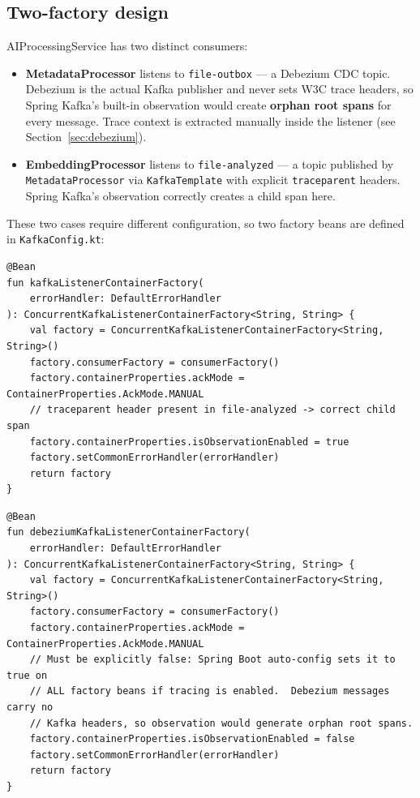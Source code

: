 \documentclass[11pt,a4paper]{article}
\begin{document}
\subsection{Two-factory design}

AIProcessingService has two distinct consumers:

\begin{itemize}
  \item \textbf{MetadataProcessor} listens to \texttt{file-outbox} --- a
        Debezium CDC topic.  Debezium is the actual Kafka publisher and never
        sets W3C trace headers, so Spring Kafka's built-in observation would
        create \textbf{orphan root spans} for every message.  Trace context is
        extracted manually inside the listener (see Section~\ref{sec:debezium}).

  \item \textbf{EmbeddingProcessor} listens to \texttt{file-analyzed} --- a
        topic published by \texttt{MetadataProcessor} via \texttt{KafkaTemplate}
        with explicit \texttt{traceparent} headers.  Spring Kafka's observation
        correctly creates a child span here.
\end{itemize}

These two cases require different configuration, so two factory beans are
defined in \texttt{KafkaConfig.kt}:

\begin{lstlisting}[style=kotlin, caption={KafkaConfig.kt --- default factory (file-analyzed)}]
@Bean
fun kafkaListenerContainerFactory(
    errorHandler: DefaultErrorHandler
): ConcurrentKafkaListenerContainerFactory<String, String> {
    val factory = ConcurrentKafkaListenerContainerFactory<String, String>()
    factory.consumerFactory = consumerFactory()
    factory.containerProperties.ackMode = ContainerProperties.AckMode.MANUAL
    // traceparent header present in file-analyzed -> correct child span
    factory.containerProperties.isObservationEnabled = true
    factory.setCommonErrorHandler(errorHandler)
    return factory
}
\end{lstlisting}

\begin{lstlisting}[style=kotlin, caption={KafkaConfig.kt --- Debezium factory (file-outbox)}]
@Bean
fun debeziumKafkaListenerContainerFactory(
    errorHandler: DefaultErrorHandler
): ConcurrentKafkaListenerContainerFactory<String, String> {
    val factory = ConcurrentKafkaListenerContainerFactory<String, String>()
    factory.consumerFactory = consumerFactory()
    factory.containerProperties.ackMode = ContainerProperties.AckMode.MANUAL
    // Must be explicitly false: Spring Boot auto-config sets it to true on
    // ALL factory beans if tracing is enabled.  Debezium messages carry no
    // Kafka headers, so observation would generate orphan root spans.
    factory.containerProperties.isObservationEnabled = false
    factory.setCommonErrorHandler(errorHandler)
    return factory
}
\end{lstlisting}
\end{document}
